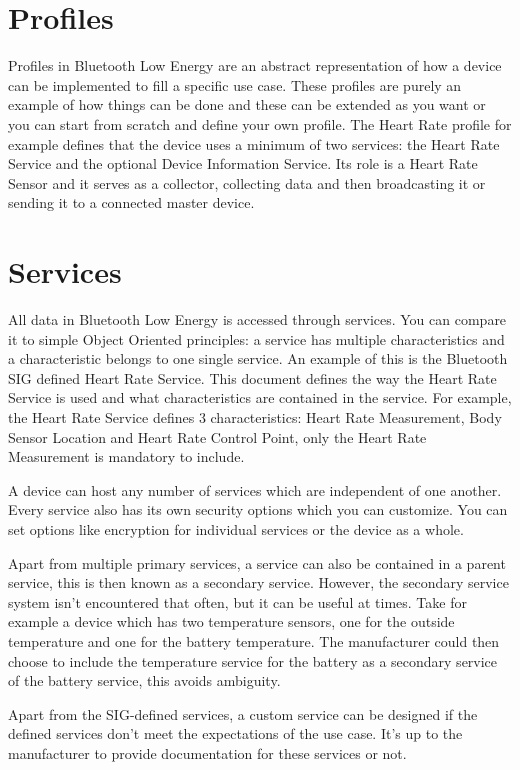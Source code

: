 \documentclass[pdftex,a4paper,12pt,twoside]{report}
\begin{document}
\section{Profiles}
\label{sec:profiles}
Profiles in Bluetooth Low Energy are an abstract representation of how a device can be implemented to fill a specific use case. These profiles are purely an example of how things can be done and these can be extended as you want or you can start from scratch and define your own profile. The Heart Rate profile for example defines that the device uses a minimum of two services: the Heart Rate Service and the optional Device Information Service. Its role is a Heart Rate Sensor and it serves as a collector, collecting data and then broadcasting it or sending it to a connected master device.

\section{Services}
\label{sec:services}
All data in Bluetooth Low Energy is accessed through services. You can compare it to simple Object Oriented principles: a service has multiple characteristics and a characteristic belongs to one single service. An example of this is the Bluetooth SIG defined Heart Rate Service. This document defines the way the Heart Rate Service is used and what characteristics are contained in the service. For example, the Heart Rate Service defines 3 characteristics: Heart Rate Measurement, Body Sensor Location and Heart Rate Control Point, only the Heart Rate Measurement is mandatory to include.

A device can host any number of services which are independent of one another. Every service also has its own security options which you can customize. You can set options like encryption for individual services or the device as a whole.

Apart from multiple primary services, a service can also be contained in a parent service, this is then known as a secondary service. However, the secondary service system isn't encountered that often, but it can be useful at times. Take for example a device which has two temperature sensors, one for the outside temperature and one for the battery temperature. The manufacturer could then choose to include the temperature service for the battery as a secondary service of the battery service, this avoids ambiguity.

Apart from the SIG-defined services, a custom service can be designed if the defined services don't meet the expectations of the use case. It's up to the manufacturer to provide documentation for these services or not.
\end{document}
